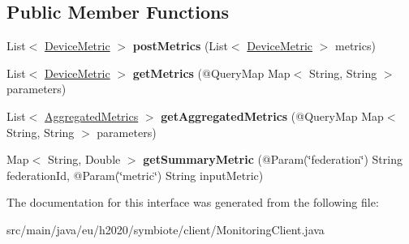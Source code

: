 \subsection*{Public Member Functions}
\begin{DoxyCompactItemize}
\item 
\mbox{\label{interfaceeu_1_1h2020_1_1symbiote_1_1client_1_1MonitoringClient_a8b9292854ae0368cf4511f11d6f6d2f0}} 
List$<$ \hyperlink{classeu_1_1h2020_1_1symbiote_1_1cloud_1_1monitoring_1_1model_1_1DeviceMetric}{Device\+Metric} $>$ {\bfseries post\+Metrics} (List$<$ \hyperlink{classeu_1_1h2020_1_1symbiote_1_1cloud_1_1monitoring_1_1model_1_1DeviceMetric}{Device\+Metric} $>$ metrics)
\item 
\mbox{\label{interfaceeu_1_1h2020_1_1symbiote_1_1client_1_1MonitoringClient_ac0e8a88857a5d918c90cf2757d8a7f49}} 
List$<$ \hyperlink{classeu_1_1h2020_1_1symbiote_1_1cloud_1_1monitoring_1_1model_1_1DeviceMetric}{Device\+Metric} $>$ {\bfseries get\+Metrics} (@Query\+Map Map$<$ String, String $>$ parameters)
\item 
\mbox{\label{interfaceeu_1_1h2020_1_1symbiote_1_1client_1_1MonitoringClient_a3de5b3904d9992639e34770cac63a113}} 
List$<$ \hyperlink{classeu_1_1h2020_1_1symbiote_1_1cloud_1_1monitoring_1_1model_1_1AggregatedMetrics}{Aggregated\+Metrics} $>$ {\bfseries get\+Aggregated\+Metrics} (@Query\+Map Map$<$ String, String $>$ parameters)
\item 
\mbox{\label{interfaceeu_1_1h2020_1_1symbiote_1_1client_1_1MonitoringClient_a5d8d79d7d345274a14c8f0dff1863f70}} 
Map$<$ String, Double $>$ {\bfseries get\+Summary\+Metric} (@Param(\char`\"{}federation\char`\"{}) String federation\+Id, @Param(\char`\"{}metric\char`\"{}) String input\+Metric)
\end{DoxyCompactItemize}


The documentation for this interface was generated from the following file\+:\begin{DoxyCompactItemize}
\item 
src/main/java/eu/h2020/symbiote/client/Monitoring\+Client.\+java\end{DoxyCompactItemize}
